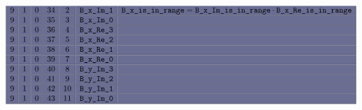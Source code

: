 \begin{figure}[h!]
\begin{adjustwidth}{-2cm}{-2cm}
{\[\begin{array}{|c|c|c|c|c|c|c|}
\rowcolor{mybackground} 9 & 1      & 0      & 34          & 2         & \locBXImOne                & \locBXIsInRange =   \locBXImIsInRange \cdot \locBXReIsInRange                                                    \\ \hline
\rowcolor{mybackground} 9 & 1      & 0      & 35          & 3         & \locBXImZero               &                                                                                                                  \\ \hline
\rowcolor{mybackground} 9 & 1      & 0      & 36          & 4         & \locBXReThree              &                                                                                                                  \\ \hline
\rowcolor{mybackground} 9 & 1      & 0      & 37          & 5         & \locBXReTwo                &                                                                                                                  \\ \hline
\rowcolor{mybackground} 9 & 1      & 0      & 38          & 6         & \locBXReOne                &                                                                                                                  \\ \hline
\rowcolor{mybackground} 9 & 1      & 0      & 39          & 7         & \locBXReZero               &                                                                                                                  \\ \hline
\rowcolor{mybackground} 9 & 1      & 0      & 40          & 8         & \locBYImThree              &                                                                                                                  \\ \hline
\rowcolor{mybackground} 9 & 1      & 0      & 41          & 9         & \locBYImTwo                &                                                                                                                  \\ \hline
\rowcolor{mybackground} 9 & 1      & 0      & 42          & 10        & \locBYImOne                &                                                                                                                  \\ \hline
\rowcolor{mybackground} 9 & 1      & 0      & 43          & 11        & \locBYImZero               &                                                                                                                  \\ \hline

\end{array}\]}
\end{adjustwidth}
\end{figure}

